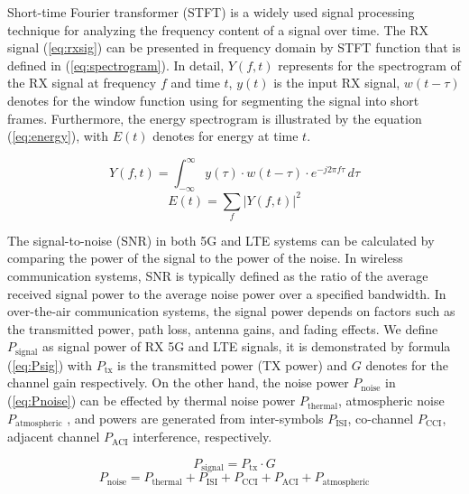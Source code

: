 \documentclass[journal]{IEEEtran} %
\begin{document}
\indent Short-time Fourier transformer (STFT) is a widely used signal processing technique for analyzing the frequency content of a signal over time. The RX signal (\ref{eq:rxsig}) can be presented in frequency domain by STFT function that is defined in (\ref{eq:spectrogram}). In detail, \( Y(f, t)\) represents for the spectrogram of the RX signal at frequency \(f\) and time \(t\), \(y(t)\) is the input RX signal, \(w(t - \tau)\) denotes for the window function using for segmenting the signal into short frames. Furthermore, the energy spectrogram is illustrated by the equation (\ref{eq:energy}), with \(E(t)\) denotes for energy at time \(t\).

\begin{equation}
    Y(f, t) = \int_{-\infty}^{\infty} y(\tau) \cdot w(t - \tau) \cdot e^{-j2\pi f \tau} \, d\tau 
    \label{eq:spectrogram}
\end{equation}
\begin{equation}
    E(t) = \sum_{f} \left| Y(f, t) \right|^2 
    \label{eq:energy}
\end{equation}


\indent The signal-to-noise (SNR) in both 5G and LTE systems can be calculated by comparing the power of the signal to the power of the noise. In wireless communication systems, SNR is typically defined as the ratio of the average received signal power to the average noise power over a specified bandwidth. In over-the-air communication systems, the signal power depends on factors such as the transmitted power, path loss, antenna gains, and fading effects. We define \(P_{\text{signal}}\) as signal power of RX 5G and LTE signals, it is demonstrated by formula (\ref{eq:Psig}) with \(P_{\text{tx}}\) is the transmitted power (TX power) and \(G\) denotes for the channel gain respectively. On the other hand, the noise power \(P_{\text{noise}}\) in (\ref{eq:Pnoise}) can be effected by thermal noise power \(P_{\text{thermal}}\), atmospheric noise \(P_{\text{atmospheric}}\) , and powers are generated from inter-symbols \(P_{\text{ISI}}\), co-channel \(P_{\text{CCI}}\), adjacent channel \(P_{\text{ACI}}\) interference, respectively. 

\begin{equation}
    P_{\text{signal}} = P_{\text{tx}} \cdot G   
    \label{eq:Psig}
\end{equation}
\begin{equation}
    P_{\text{noise}} = P_{\text{thermal}} + P_{\text{ISI}} + P_{\text{CCI}} + P_{\text{ACI}} + P_{\text{atmospheric}}   
    \label{eq:Pnoise}
\end{equation}
\end{document}
